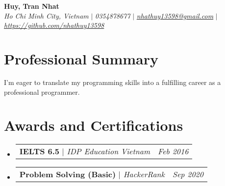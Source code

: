 \documentclass[letterpaper,10pt]{article}
\makeatletter
\newcommand{\sectionspace}{
\vspace{-20pt}
}
\newcommand{\subheadingtitlevspace}{
\vspace{-3pt}
}
\newcommand{\titleItem}[1]{
  \textbf{#1}
}
\newcommand{\resumeProjectHeading}[2]{
    \item
    \begin{tabular*}{0.97\textwidth}{l@{\extracolsep{\fill}}r}
      #1 & \textit{ #2} \\
    \end{tabular*}\vspace{-9pt}
}
\newcommand{\resumeSubHeadingListStart}{\subheadingtitlevspace\begin{itemize}[leftmargin=0.15in, label={}]}
\newcommand{\resumeSubHeadingListEnd}{\end{itemize}}
\makeatother
\begin{document}

\begin{flushleft}
    \textbf{\large Huy, Tran Nhat} \\    
    \textit{Ho Chi Minh City, Vietnam} $|$ 
    \textit{0354878677} $|$  
    \href{mailto:nhathuy13598@gmail.com}{{\textit{nhathuy13598@gmail.com}}} $|$ 
    \href{https://github.com/nhathuy13598}{{\textit{https://github.com/nhathuy13598}}}
    \vspace{-8pt}
\end{flushleft}


\section{Professional Summary}
\vspace{-3pt}
\begin{itemize}[leftmargin=0.15in, label={}]
    {\item{
     {I'm eager to translate my programming skills into a fulfilling career as a professional programmer.} \\      
    }}
 \end{itemize}
 \sectionspace



\section{Awards and Certifications}
    \resumeSubHeadingListStart
      \resumeProjectHeading
          {\titleItem{IELTS 6.5} \emph{ $|$ IDP Education Vietnam}}{Feb 2016}
      \resumeProjectHeading
          {\titleItem{Problem Solving (Basic)} \emph{ $|$ HackerRank}}{Sep 2020}
    \resumeSubHeadingListEnd
\end{document}

